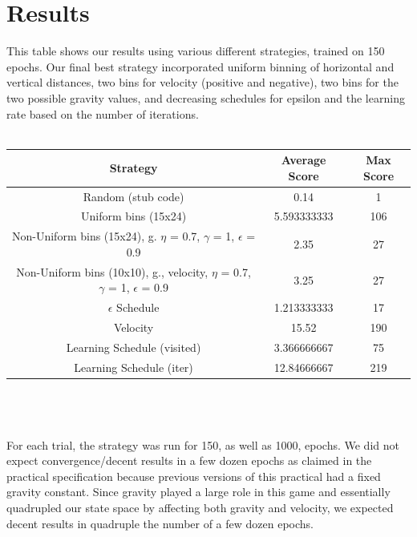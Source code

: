 \documentclass[11pt]{article}
\begin{document}
\section{Results}
This table shows our results using various different strategies, trained on 150 epochs.  Our final best strategy incorporated uniform binning of horizontal and vertical distances, two bins for velocity (positive and negative), two bins for the two possible gravity values, and decreasing schedules for epsilon and the learning rate based on the number of iterations. \normalsize
\\\\
\begin{tabular}{c|c|c}
Strategy & Average Score & Max Score \\ 
\hline
Random (stub code) & 0.14 & 1 \\ 
Uniform bins (15x24) & 5.593333333 & 106 \\ 
Non-Uniform bins (15x24), g. $\eta$ = 0.7, $\gamma$ = 1, $\epsilon$ = 0.9 & 2.35 & 27 \\ 
Non-Uniform bins (10x10), g., velocity, $\eta$ = 0.7, $\gamma$ = 1, $\epsilon$ = 0.9 & 3.25 & 27 \\ 
$\epsilon$ Schedule & 1.213333333 & 17 \\ 
Velocity & 15.52 & 190 \\ 
Learning Schedule (visited) & 3.366666667 & 75 \\ 
Learning Schedule (iter) & 12.84666667 & 219
\end{tabular}
\\\\\\
For each trial, the strategy was run for 150, as well as 1000, epochs. We did not expect convergence/decent results in a few dozen epochs as claimed in the practical specification because previous versions of this practical had a fixed gravity constant. Since gravity played a large role in this game and essentially quadrupled our state space by affecting both gravity and velocity, we expected decent results in quadruple the number of a few dozen epochs.
\end{document}
